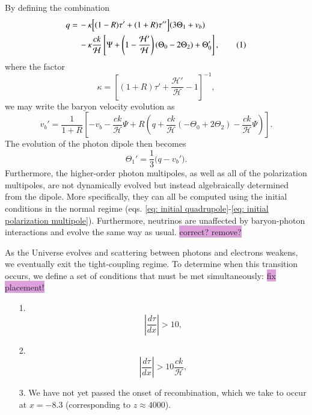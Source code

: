 \documentclass{aa}
\newcommand\numberthis{\addtocounter{equation}{1}\tag{\theequation}}
\numberwithin{equation}{section}
\numberwithin{table}{section}
\numberwithin{figure}{section}
\begin{document}
By defining the combination
\begin{align*}
q =\, &-\kappa\Big[(1 - R)\tau' + (1 + R)\tau''\Big](3\Theta_1 + v_b) \\
&-\kappa\frac{ck}{\mathcal{H}}\left[\Psi + \left(1 - \frac{\mathcal{H}'}{\mathcal{H}}\right)(\Theta_0 - 2\Theta_2) + \Theta_0'\right], \numberthis
\end{align*}
where the factor
\begin{equation}
  \kappa = \left[(1+R)\tau' + \frac{\mathcal{H'}}{\mathcal{H}}-1\right]^{-1},
\end{equation}
we may write the baryon velocity evolution as
\begin{equation}
v_b' = \frac{1}{1 + R} \left[ -v_b - \frac{ck}{\mathcal{H}} \Psi + R \left( q + \frac{ck}{\mathcal{H}}(-\Theta_0 + 2\Theta_2) - \frac{ck}{\mathcal{H}} \Psi \right) \right].
\end{equation}
The evolution of the photon dipole then becomes
\begin{equation}
\Theta_1' = \frac{1}{3} \big(q - v_b'\big).
\end{equation}
Furthermore, the higher-order photon multipoles, as well as all of the polarization multipoles, are not dynamically evolved but instead algebraically determined from the dipole. More specifically, they can all be computed using the initial conditions in the normal regime (eqs. \eqref{eq: initial quadrupole}-\eqref{eq: initial polarization multipole}). Furthermore, neutrinos are unaffected by baryon-photon interactions and evolve the same way as usual. \colorbox{Plum}{correct? remove?}

As the Universe evolves and scattering between photons and electrons weakens, we eventually exit the tight-coupling regime. To determine when this transition occurs, we define a set of conditions that must be met simultaneously: \colorbox{Plum}{fix placement!} 
\begin{enumerate}
  \item [1.] \begin{equation}
    \left|\frac{d\tau}{dx}\right| > 10,
  \end{equation}
  \item [2.] \begin{equation}
    \left|\frac{d\tau}{dx}\right| > 10 \frac{ck}{\mathcal{H}},
  \end{equation}
  \item [3.] We have not yet passed the onset of recombination, which we take to occur at $x = -8.3$ (corresponding to $z \approx 4000$).  
\end{enumerate}
\end{document}
